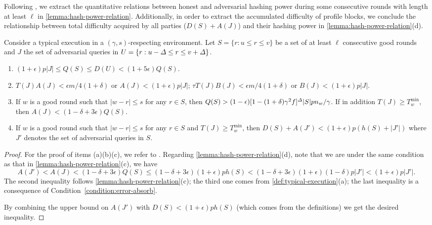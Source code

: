 Following \cite{EPRINT:GarKiaLeo20}, we extract the quantitative relations between honest and adversarial hashing power during some consecutive rounds with length at least $\ell$ in \cref{lemma:hash-power-relation}.
%
Additionally, in order to extract the accumulated difficulty of profile blocks, we conclude the relationship between total difficulty acquired by all parties ($D(S) + A(J)$) and their hashing power in \cref{lemma:hash-power-relation}(d).

\begin{lemma} \label{lemma:hash-power-relation}
    Consider a typical execution in a $(\gamma, s)$-respecting environment.
    Let $S = \{r : u \le r \le v \}$ be a set of at least $\ell$ consecutive good rounds and $J$ the set of adversarial queries in $U = \{ r : u - \varDelta \le r \le v + \varDelta\}$.
    \begin{enumerate}[label=(\alph*), leftmargin=*, nosep]
        \item $(1 + \epsilon) p|J| \le Q(S) \le D(U) < (1 + 5\epsilon) Q(S)$.

        \item $T(J) A(J) < \epsilon m/4(1 + \delta)$ or $A(J) < (1 + \epsilon)p|J|$; $\tau T(J) B(J) < \epsilon m/4(1 + \delta)$ or $B(J) < (1 + \epsilon) p|J|$.

        \item If $w$ is a good round such that $|w - r| \le s$ for any $r \in S$, then $Q(S) > (1 - \epsilon)[1 - (1 + \delta) \gamma^2 f]^\varDelta |S| p n_w / \gamma$. If in addition $T(J) \ge T^{\min}_w$, then $A(J) < (1 - \delta + 3\epsilon) Q(S)$.

        \item If $w$ is a good round such that $|w - r| \le s$ for any $r \in S$ and $T(J) \ge T^{\min}_w$, then $D(S) + A(J') < (1 + \epsilon) p(h(S) + |J'|)$ where $J'$ denotes the set of adversarial queries in $S$.
    \end{enumerate}
\end{lemma}

\begin{proof}
    For the proof of items (a)(b)(c), we refer to \cite{EPRINT:GarKiaLeo20}.
    Regarding \cref{lemma:hash-power-relation}(d), note that we are under the same condition as that in \cref{lemma:hash-power-relation}(c), we have
    \[ A(J') < A(J) < (1 - \delta + 3\epsilon) Q(S) \le (1 - \delta + 3\epsilon) (1 + \epsilon) p h(S) < (1 - \delta + 3\epsilon) (1 + \epsilon) (1 - \delta) p |J'| < (1 + \epsilon) p |J'|. \]
    The second inequality follows \cref{lemma:hash-power-relation}(c); the third one comes from \cref{def:typical-execution}(a); the last inequality is a consequence of Condition~\eqref{condition:error-absorb}.

    By combining the upper bound on $A(J')$ with $D(S) < (1 + \epsilon) p h(S)$ (which comes from the definitions) we get the desired inequality.
\end{proof}

